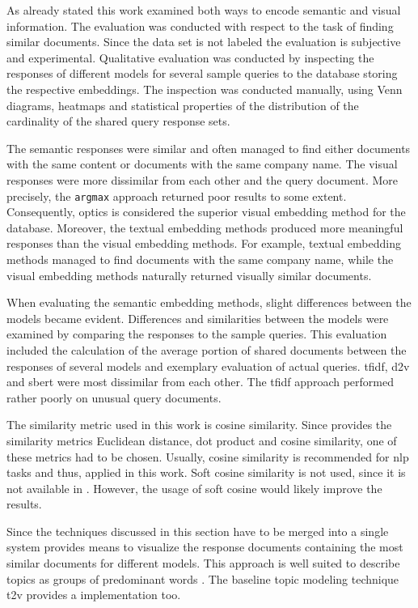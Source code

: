 As already stated this work examined both ways to encode semantic and visual information.
The evaluation was conducted with respect to the task of finding similar documents.
Since the data set is not labeled the evaluation is subjective and experimental.
Qualitative evaluation was conducted by inspecting the responses of different models for several sample queries to the database 
storing the respective embeddings.
The inspection was conducted manually, 
using Venn diagrams, heatmaps and 
statistical properties of the distribution of the cardinality of the shared query response sets.

The semantic responses were similar and often managed to find either documents with the same content or documents with the same company name.
The visual responses were more dissimilar from each other and the query document.
More precisely, the \texttt{argmax} approach returned poor results to some extent.
Consequently, \ac{optics} is considered the superior visual embedding method for the database.
Moreover, the textual embedding methods produced more meaningful responses than the visual embedding methods.
For example, textual embedding methods managed to find documents with the same company name, 
while the visual embedding methods naturally returned visually similar documents.


When evaluating the semantic embedding methods, slight differences between the models became evident.
Differences and similarities between the models were examined by comparing the responses to the sample queries.
This evaluation included the calculation of the average portion of shared documents between the responses of several models 
and exemplary evaluation of actual queries.
\ac{tfidf}, \ac{d2v} and \ac{sbert} were most dissimilar from each other.
The \ac{tfidf} approach performed rather poorly on unusual query documents.


The similarity metric used in this work is cosine similarity.
Since \databaseName{} provides the similarity metrics Euclidean distance, dot product and cosine similarity,
one of these metrics had to be chosen.
Usually, cosine similarity is recommended for \ac{nlp} tasks and thus, applied in this work.
Soft cosine similarity is not used, since it is not available in \databaseName{}.
However, the usage of soft cosine would likely improve the results.

Since the techniques discussed in this section have to be merged into a single system 
\wordcloud{} provides means to visualize the response documents containing the most similar documents for different models.
This approach is well suited to describe topics as groups of predominant words \cite{topic_modeling2019}.
The baseline topic modeling technique \ac{t2v} provides a \wordcloud{} implementation too.


